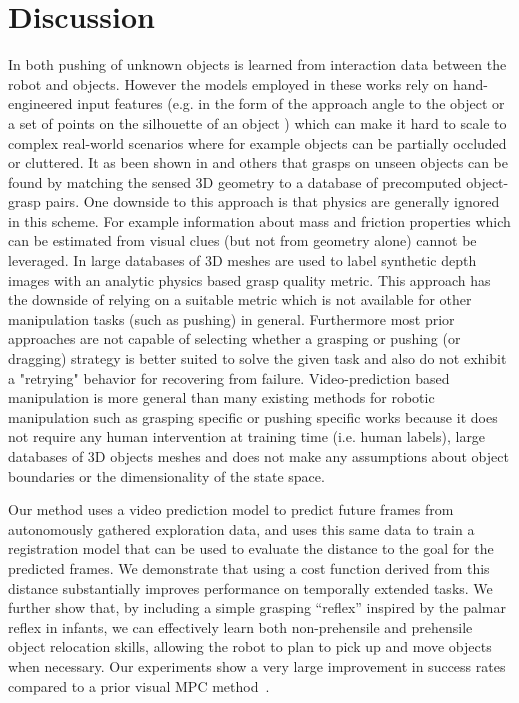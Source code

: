 \section{Discussion}

In both \cite{hermans2013learning,salganicoff1993vision} pushing of unknown objects is learned from interaction data between the robot and objects. However the models employed in these works rely on hand-engineered input features (e.g. in the form of the approach angle to the object \cite{salganicoff1993vision} or a set of points on the silhouette of an object \cite{hermans2013learning}) which can make it hard to scale to complex real-world scenarios where for example objects can be partially occluded or cluttered. 
It as been shown in \cite{goldfeder2009data} and others that grasps on unseen objects can be found by matching the sensed 3D geometry to a database of precomputed object-grasp pairs. One downside to this approach is that physics are generally ignored in this scheme. For example information about mass and friction properties which can be estimated from visual clues (but not from geometry alone) cannot be leveraged. In \cite{mahler2017dex} large databases of 3D meshes are used to label synthetic depth images with an analytic physics based grasp quality metric. This approach has the downside of relying on a suitable metric which is not available for other manipulation tasks (such as pushing) in general.
Furthermore most prior approaches are not capable of selecting whether a grasping or pushing (or dragging) strategy is better suited to solve the given task and also do not exhibit a "retrying" behavior for recovering from failure.
Video-prediction based manipulation is more general than many existing methods for robotic manipulation such as grasping specific \cite{lenz2015deep, goldfeder2009data, zeng2017robotic} or pushing specific works \cite{hermans2013learning, salganicoff1993vision} because it does not require any human intervention at training time (i.e. human labels), large databases of 3D objects meshes and does not make any assumptions about object boundaries or the dimensionality of the state space.

Our method uses a video prediction model to predict future frames from autonomously gathered exploration data, and uses this same data to train a registration model that can be used to evaluate the distance to the goal for the predicted frames. We demonstrate that using a cost function derived from this distance substantially improves performance on temporally extended tasks. We further show that, by including a simple grasping ``reflex'' inspired by the palmar reflex in infants, we can effectively learn both non-prehensile and prehensile object relocation skills, allowing the robot to plan to pick up and move objects when necessary. Our experiments show a very large improvement in success rates compared to a prior visual MPC method~\cite{sna}.
